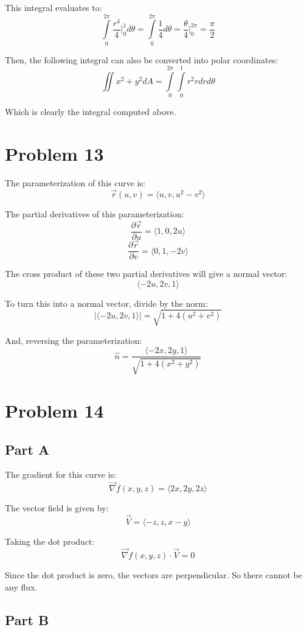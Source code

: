 \documentclass{article}
\begin{document}
This integral evaluates to:
$$ \int\limits_0^{2\pi} \frac{r^4}{4} \bigg\vert_0^1 d\theta =
\int\limits_0^{2\pi} \frac{1}{4} d\theta = \frac{\theta}{4} \bigg\vert_0^{2\pi}
= \frac{\pi}{2} $$

Then, the following integral can also be converted into polar coordinates:
$$ \iint x^2 + y^2 dA = \int\limits_0^{2\pi}\int\limits_0^1 r^2 r dr d\theta $$

Which is clearly the integral computed above.

\section*{Problem 13}

The parameterization of this curve is:
$$ \vec{r}(u,v) = \langle u, v, u^2 - v^2 \rangle $$

The partial derivatives of this parameterization:
$$ \frac{\partial \vec{r}}{\partial u} = \langle 1, 0, 2u \rangle $$
$$ \frac{\partial \vec{r}}{\partial v} = \langle 0, 1, -2v \rangle $$

The cross product of these two partial derivatives will give a normal vector:
$$ \langle -2u, 2v, 1 \rangle $$

To turn this into a normal vector, divide by the norm:
$$ \vert\langle -2u, 2v, 1 \rangle \vert = \sqrt{1 + 4(u^2 + v^2)} $$

And, reversing the parameterization:
$$ \hat{n} = \frac{\langle -2x, 2y, 1 \rangle}{\sqrt{1 +4(x^2 + y^2)}} $$

\section*{Problem 14}

\subsection*{Part A}

The gradient for this curve is:
$$ \vec{\nabla} f(x, y, z) = \langle 2x, 2y, 2z \rangle $$

The vector field is given by:
$$ \vec{V} = \langle -z, z, x-y \rangle $$

Taking the dot product:
$$ \vec{\nabla} f(x, y, z) \cdot \vec{V} = 0 $$

Since the dot product is zero, the vectors are perpendicular. So there cannot be
any flux.

\subsection*{Part B}
\end{document}
